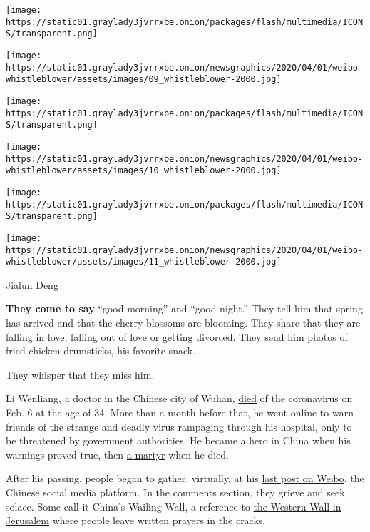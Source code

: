 \texttt{[image: https://static01.graylady3jvrrxbe.onion/packages/flash/multimedia/ICONS/transparent.png]}

\texttt{[image: https://static01.graylady3jvrrxbe.onion/newsgraphics/2020/04/01/weibo-whistleblower/assets/images/09\_whistleblower-2000.jpg]}

\texttt{[image: https://static01.graylady3jvrrxbe.onion/packages/flash/multimedia/ICONS/transparent.png]}

\texttt{[image: https://static01.graylady3jvrrxbe.onion/newsgraphics/2020/04/01/weibo-whistleblower/assets/images/10\_whistleblower-2000.jpg]}

\texttt{[image: https://static01.graylady3jvrrxbe.onion/packages/flash/multimedia/ICONS/transparent.png]}

\texttt{[image: https://static01.graylady3jvrrxbe.onion/newsgraphics/2020/04/01/weibo-whistleblower/assets/images/11\_whistleblower-2000.jpg]}

Jialun Deng

\textbf{They come to say} ``good morning'' and ``good night.'' They tell
him that spring has arrived and that the cherry blossoms are blooming.
They share that they are falling in love, falling out of love or getting
divorced. They send him photos of fried chicken drumsticks, his favorite
snack.

They whisper that they miss him.

Li Wenliang, a doctor in the Chinese city of Wuhan,
\href{https://www.nytimes3xbfgragh.onion/2020/02/06/world/asia/chinese-doctor-Li-Wenliang-coronavirus.html}{died}
of the coronavirus on Feb. 6 at the age of 34. More than a month before
that, he went online to warn friends of the strange and deadly virus
rampaging through his hospital, only to be threatened by government
authorities. He became a hero in China when his warnings proved true,
then
\href{https://www.nytimes3xbfgragh.onion/2020/02/07/business/china-coronavirus-doctor-death.html}{a
martyr} when he died.

After his passing, people began to gather, virtually, at his
\href{https://www.weibo.com/1139098205/Is9M7taaY?filter=hot\&root_comment_id=0\&type=comment\&sudaref=www.weibo.com\&display=0\&retcode=6102}{last
post on Weibo}, the Chinese social media platform. In the comments
section, they grieve and seek solace. Some call it China's Wailing Wall,
a reference to
\href{https://www.nytimes3xbfgragh.onion/2016/02/03/world/middleeast/new-western-wall-prayer-space-highlights-wider-divide-among-jews.html}{the
Western Wall in Jerusalem} where people leave written prayers in the
cracks.

